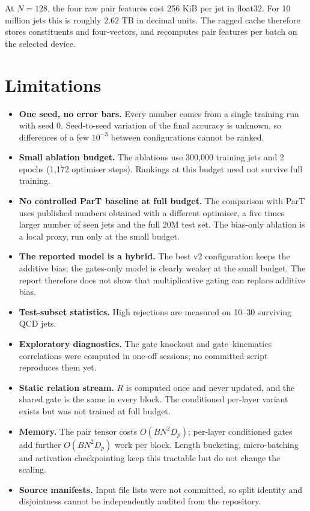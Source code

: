 \documentclass[11pt,a4paper]{article}
\numberwithin{equation}{section}
\begin{document}
At $N=128$, the four raw pair features cost 256 KiB per jet in float32.
For 10 million jets this is roughly 2.62 TB in decimal units.
The ragged cache therefore stores constituents and four-vectors, and
recomputes pair features per batch on the selected device.


\section{Limitations}\label{sec:limitations}
\begin{itemize}
 \item \textbf{One seed, no error bars.} Every number comes from a single training run with seed
   0. Seed-to-seed variation of the final accuracy is unknown, so differences of a few
   $10^{-3}$ between configurations cannot be ranked.
 \item \textbf{Small ablation budget.} The ablations use 300,000 training jets and 2 epochs
   (1,172 optimiser steps). Rankings at this budget need not survive full training.
 \item \textbf{No controlled ParT baseline at full budget.} The comparison with ParT uses published
   numbers obtained with a different optimiser, a five times larger number of seen jets and the
   full 20M test set. The bias-only ablation is a local proxy, run only at the small budget.
 \item \textbf{The reported model is a hybrid.} The best v2 configuration keeps the additive bias;
   the gates-only model is clearly weaker at the small budget. The report therefore does not show
   that multiplicative gating can replace additive bias.
 \item \textbf{Test-subset statistics.} High rejections are measured on 10--30 surviving QCD jets.
 \item \textbf{Exploratory diagnostics.} The gate knockout and gate--kinematics correlations were
   computed in one-off sessions; no committed script reproduces them yet.
 \item \textbf{Static relation stream.} $R$ is computed once and never updated, and the shared gate
   is the same in every block. The conditioned per-layer variant exists but was not trained at full
   budget.
 \item \textbf{Memory.} The pair tensor costs $O(BN^2D_p)$; per-layer conditioned gates add
   further $O(BN^2D_p)$ work per block. Length bucketing, micro-batching and activation
   checkpointing keep this tractable but do not change the scaling.
 \item \textbf{Source manifests.} Input file lists were not committed, so split
   identity and disjointness cannot be independently audited from the repository.
\end{itemize}
\end{document}
